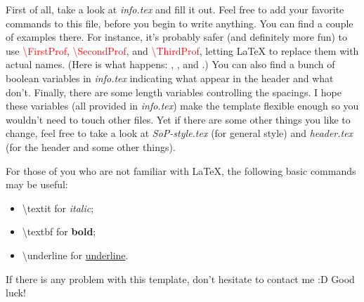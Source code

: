 










First of all, take a look at \emph{info.tex}
and fill it out.
Feel free to add your favorite commands to this file,
before you begin to write anything.
You can find a couple of examples there.
For instance, it's probably safer
(and definitely more fun) to use
\textcolor{red}{\textbackslash FirstProf},
\textcolor{red}{\textbackslash SecondProf}, and
\textcolor{red}{\textbackslash ThirdProf},
letting \LaTeX{} to replace them
with actual names.
(Here is what happens:
\FirstProf, \SecondProf, and \ThirdProf.)
You can also find a bunch of boolean variables
in \emph{info.tex}
indicating what appear in the header and what don't.
Finally, there are some length variables
controlling the spacings.
I hope these variables (all provided in \emph{info.tex})
make the template flexible enough
so you wouldn't need to touch other files.
Yet if there are some other things you like to change,
feel free to take a look at
\emph{SoP-style.tex} (for general style)
and \emph{header.tex}
(for the header and some other things).

For those of you who are not familiar with \LaTeX,
the following basic commands may be useful:
\begin{itemize}
\itemsep0em
\item \textbackslash textit for \textit{italic};
\item \textbackslash textbf for \textbf{bold};
\item \textbackslash underline for \underline{underline}.
\end{itemize}

If there is any problem with this template,
don't hesitate to contact me :D Good luck!

\mySigniture



